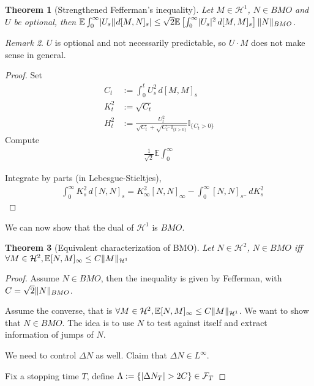 \documentclass[openany,oneside]{book}
\newtheorem{thm}{Theorem}[section]
\theoremstyle{definition}
\theoremstyle{remark}
\newtheorem{rem}[thm]{Remark}
\newcommand{\E}{\mathbb{E}} %
\newcommand{\I}{\mathbb{I}} %
\DeclarePairedDelimiter{\abs}{\lvert}{\rvert} %
\DeclarePairedDelimiter{\norm}{\lVert}{\rVert} %
\newcommand{\sH}[1][2]{\mathcal{H}^{#1}} %
\begin{document}
\begin{thm}[Strengthened Fefferman's inequality]
Let $M\in\mathcal{H}^1$, $N\in BMO$ and $U$ be optional, then $\E\int_0^\infty \abs{U_s}\abs{d[M,N]_s} \le \sqrt{2} \E\left[\int_0^\infty \abs{U_s}^2 \,d[M,M]_s \right] \norm{N}_{BMO}$.
\end{thm}
\begin{rem}
$U$ is optional and not necessarily predictable, so $U\cdot M$ does not make sense in general.
\end{rem}
\begin{proof}
Set
\begin{align*}
C_t &:= \int_0^t U_s^2 \,d [M,M]_s \\
K_t^2 &:= \sqrt{C_t} \\
H_t^2 &:= \frac{U_t^2}{\sqrt{C_t} + \sqrt{C_{t^-} \I_{\{t>0\}}}} \I_{\{C_t >0\}}
\end{align*}
Compute
\begin{align*}
\frac{1}{\sqrt{2}} \E\int_0^\infty
\end{align*}


Integrate by parts (in Lebesgue-Stieltjes),
\begin{align*}
& \int_0^\infty K^2_s \,d[N,N]_s = K^2_\infty [N,N]_\infty - \int_0^\infty [N,N]_{s^-} \,d K^2_s
\end{align*}
\end{proof}

We can now show that the dual of $\mathcal{H}^1$ is $BMO$.
\begin{thm}[Equivalent characterization of BMO]
Let $N\in \sH$, $N\in BMO$ iff $\forall M\in \sH, \E[N,M]_\infty \le C\norm{M}_{\mathcal{H}^1}$
\end{thm}
\begin{proof}
Assume $N\in BMO$, then the inequality is given by Fefferman, with $C=\sqrt{2}\norm{N}_{BMO}$.
\par
Assume the converse, that is $\forall M\in \sH, \E[N,M]_\infty \le C\norm{M}_{\mathcal{H}^1}$. We want to show that $N\in BMO$. The idea is to use $N$ to test against itself and extract information of jumps of $N$.
\par

We need to control $\Delta N$ as well. Claim that $\Delta N\in L^\infty$.
\par
Fix a stopping time $T$, define $\Lambda:=\{\abs{\Delta N_T} > 2C\} \in \mathcal{F}_T$
\end{proof}
\end{document}

